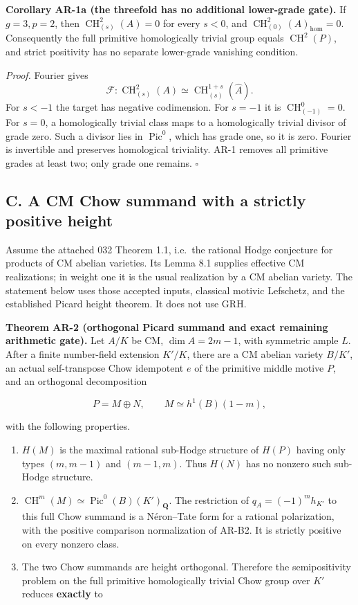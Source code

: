 \textbf{Corollary AR-1a (the threefold has no additional lower-grade
gate).} If \(g=3,p=2\), then \(\operatorname{CH}^2_{(s)}(A)=0\) for
every \(s<0\), and \(\operatorname{CH}^2_{(0)}(A)_{\mathrm{hom}}=0\).
Consequently the full primitive homologically trivial group equals
\(\operatorname{CH}^2(P)\), and strict positivity has no separate
lower-grade vanishing condition.

\emph{Proof.} Fourier gives \[
\mathcal F:\operatorname{CH}^2_{(s)}(A)
 \simeq\operatorname{CH}^{1+s}_{(s)}(\widehat A).
\] For \(s<-1\) the target has negative codimension. For \(s=-1\) it is
\(\operatorname{CH}^0_{(-1)}=0\). For \(s=0\), a homologically trivial
class maps to a homologically trivial divisor of grade zero. Such a
divisor lies in \(\operatorname{Pic}^0\), which has grade one, so it is
zero. Fourier is invertible and preserves homological triviality. AR-1
removes all primitive grades at least two; only grade one remains.
\(\square\)

\subsection{C. A CM Chow summand with a strictly positive
height}\label{c.-a-cm-chow-summand-with-a-strictly-positive-height}

Assume the attached 032 Theorem 1.1, i.e.~the rational Hodge conjecture
for products of CM abelian varieties. Its Lemma 8.1 supplies effective
CM realizations; in weight one it is the usual realization by a CM
abelian variety. The statement below uses those accepted inputs,
classical motivic Lefschetz, and the established Picard height theorem.
It does not use GRH.

\textbf{Theorem AR-2 (orthogonal Picard summand and exact remaining
arithmetic gate).} Let \(A/K\) be CM, \(\dim A=2m-1\), with symmetric
ample \(L\). After a finite number-field extension \(K'/K\), there are a
CM abelian variety \(B/K'\), an actual self-transpose Chow idempotent
\(e\) of the primitive middle motive \(P\), and an orthogonal
decomposition

\[
P=M\oplus N,\qquad M\simeq h^1(B)(1-m),
\tag{AR.4}
\]

with the following properties.

\begin{enumerate}
\def\labelenumi{\arabic{enumi}.}
\tightlist
\item
  \(H(M)\) is the maximal rational sub-Hodge structure of \(H(P)\)
  having only types \((m,m-1)\) and \((m-1,m)\). Thus \(H(N)\) has no
  nonzero such sub-Hodge structure.
\item
  \(\operatorname{CH}^m(M)\simeq\operatorname{Pic}^0(B)(K')_{\mathbf Q}\).
  The restriction of \(q_A=(-1)^m h_{K'}\) to this full Chow summand is
  a Néron--Tate form for a rational polarization, with the positive
  comparison normalization of AR-B2. It is strictly positive on every
  nonzero class.
\item
  The two Chow summands are height orthogonal. Therefore the
  semipositivity problem on the full primitive homologically trivial
  Chow group over \(K'\) reduces \textbf{exactly} to
\end{enumerate}

